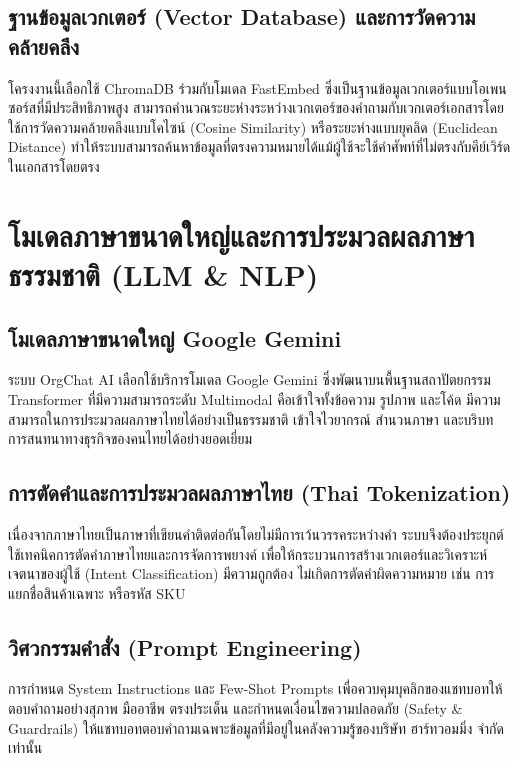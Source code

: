 \subsection{ฐานข้อมูลเวกเตอร์ (Vector Database) และการวัดความคล้ายคลึง}
\hspace*{1.3em}
โครงงานนี้เลือกใช้ ChromaDB ร่วมกับโมเดล FastEmbed ซึ่งเป็นฐานข้อมูลเวกเตอร์แบบโอเพนซอร์สที่มีประสิทธิภาพสูง สามารถคำนวณระยะห่างระหว่างเวกเตอร์ของคำถามกับเวกเตอร์เอกสารโดยใช้การวัดความคล้ายคลึงแบบโคไซน์ (Cosine Similarity) หรือระยะห่างแบบยุคลิด (Euclidean Distance) ทำให้ระบบสามารถค้นหาข้อมูลที่ตรงความหมายได้แม้ผู้ใช้จะใช้คำศัพท์ที่ไม่ตรงกับคีย์เวิร์ดในเอกสารโดยตรง

\section{โมเดลภาษาขนาดใหญ่และการประมวลผลภาษาธรรมชาติ (LLM \& NLP)}

\subsection{โมเดลภาษาขนาดใหญ่ Google Gemini}
\hspace*{1.3em}
ระบบ OrgChat AI เลือกใช้บริการโมเดล Google Gemini ซึ่งพัฒนาบนพื้นฐานสถาปัตยกรรม Transformer ที่มีความสามารถระดับ Multimodal คือเข้าใจทั้งข้อความ รูปภาพ และโค้ด มีความสามารถในการประมวลผลภาษาไทยได้อย่างเป็นธรรมชาติ เข้าใจไวยากรณ์ สำนวนภาษา และบริบทการสนทนาทางธุรกิจของคนไทยได้อย่างยอดเยี่ยม

\subsection{การตัดคำและการประมวลผลภาษาไทย (Thai Tokenization)}
\hspace*{1.3em}
เนื่องจากภาษาไทยเป็นภาษาที่เขียนคำติดต่อกันโดยไม่มีการเว้นวรรคระหว่างคำ ระบบจึงต้องประยุกต์ใช้เทคนิคการตัดคำภาษาไทยและการจัดการพยางค์ เพื่อให้กระบวนการสร้างเวกเตอร์และวิเคราะห์เจตนาของผู้ใช้ (Intent Classification) มีความถูกต้อง ไม่เกิดการตัดคำผิดความหมาย เช่น การแยกชื่อสินค้าเฉพาะ หรือรหัส SKU

\subsection{วิศวกรรมคำสั่ง (Prompt Engineering)}
\hspace*{1.3em}
การกำหนด System Instructions และ Few-Shot Prompts เพื่อควบคุมบุคลิกของแชทบอทให้ตอบคำถามอย่างสุภาพ มืออาชีพ ตรงประเด็น และกำหนดเงื่อนไขความปลอดภัย (Safety \& Guardrails) ให้แชทบอทตอบคำถามเฉพาะข้อมูลที่มีอยู่ในคลังความรู้ของบริษัท ฮาร์ทวอมมิ่ง จำกัด เท่านั้น


